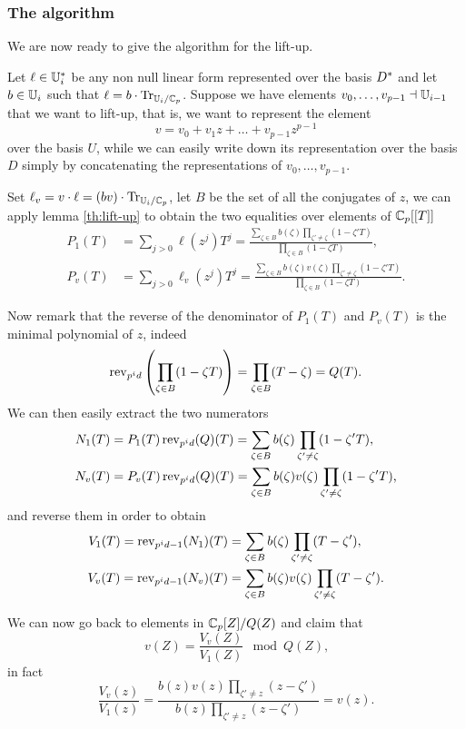 \subsubsection{The algorithm}
We are now ready to give the algorithm for the lift-up.

Let $\ell\in\mathbb{U}_i^\ast$ be any non null linear form represented over
the basis $D^\ast$ and let $b\in\mathbb{U}_i$ such that
$\ell=b\cdot\operatorname{Tr}_{\mathbb{U}_i/\mathbb{C}_p}$. Suppose we have elements
$v_0,\ldots,v_{p-1}\dashv\mathbb{U}_{i-1}$ that we want to lift-up, that is, we
want to represent the element
\[v = v_0 + v_1z + \ldots + v_{p-1}z^{p-1} \]
over the basis $U$, while we can easily write down its representation
over the basis $D$ simply by concatenating the representations of
$v_0,\ldots,v_{p-1}$.

Set $\ell_v = v\cdot\ell = (bv)\cdot\operatorname{Tr}_{\mathbb{U}_i/\mathbb{C}_p}$, let $B$ be the
set of all the conjugates of $z$, we can apply lemma \ref{th:lift-up}
to obtain the two equalities over elements of $\mathbb{C}_p[[T]]$
\begin{align}
  P_1(T)& = \sum_{j>0}\ell(z^j)T^j =
  \frac{\sum_{\zeta\in B}b(\zeta)\prod_{\zeta'\ne\zeta}(1-\zeta'T)}
       {\prod_{\zeta\in B}(1-\zeta T)} \text{,}\\
  P_v(T)& = \sum_{j>0}\ell_v(z^j)T^j =
  \frac{\sum_{\zeta\in B}b(\zeta)v(\zeta)\prod_{\zeta'\ne\zeta}(1-\zeta'T)}
       {\prod_{\zeta\in B}(1-\zeta T)} \text{.}
\end{align}

Now remark that the reverse of the denominator of $P_1(T)$ and $P_v(T)$ is
the minimal polynomial of $z$, indeed
\[\operatorname{rev}_{p^id}\left(\prod_{\zeta\in B}(1-\zeta T)\right) =
\prod_{\zeta\in B}(T -\zeta) = Q(T)\text{.}\]
We can then easily extract the two numerators
\begin{align}
  N_1(T) &= P_1(T)\operatorname{rev}_{p^id}(Q)(T) =
  \sum_{\zeta\in B}b(\zeta)\prod_{\zeta'\ne\zeta}(1-\zeta'T) \text{,}\\
  N_v(T) &= P_v(T)\operatorname{rev}_{p^id}(Q)(T) =
  \sum_{\zeta\in B}b(\zeta)v(\zeta)\prod_{\zeta'\ne\zeta}(1-\zeta'T)
  \text{,}
\end{align}
and reverse them in order to obtain
\begin{align}
  V_1(T) = \operatorname{rev}_{p^id-1}(N_1)(T) &=
  \sum_{\zeta\in B}b(\zeta)\prod_{\zeta'\ne\zeta}(T-\zeta') \text{,}\\
  V_v(T) = \operatorname{rev}_{p^id-1}(N_v)(T) &=
  \sum_{\zeta\in B}b(\zeta)v(\zeta)\prod_{\zeta'\ne\zeta}(T-\zeta')
  \text{.}
\end{align}

We can now go back to elements in $\mathbb{C}_p[Z]/Q(Z)$ and claim that
\begin{equation}
  v(Z) = \frac{V_v(Z)}{V_1(Z)} \mod Q(Z) \text{,}
\end{equation}
in fact
\begin{equation*}
  \frac{V_v(z)}{V_1(z)} =
  \frac{b(z)v(z)\prod_{\zeta'\ne z}(z-\zeta')}{b(z)\prod_{\zeta'\ne z}(z-\zeta')}
  = v(z) \text{.}
\end{equation*}

